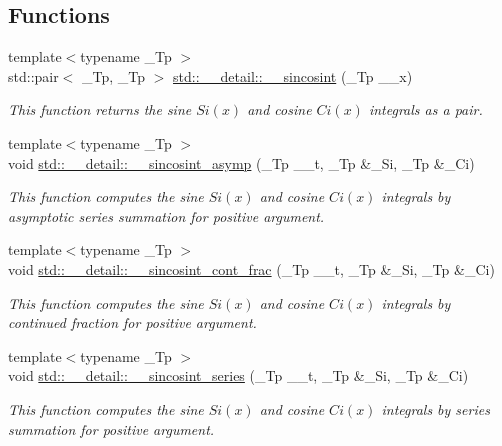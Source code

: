 \subsection*{Functions}
\begin{DoxyCompactItemize}
\item 
{\footnotesize template$<$typename \+\_\+\+Tp $>$ }\\std\+::pair$<$ \+\_\+\+Tp, \+\_\+\+Tp $>$ \hyperlink{namespacestd_1_1____detail_a53bf807a99eef68cdb6f917c7ca085bf}{std\+::\+\_\+\+\_\+detail\+::\+\_\+\+\_\+sincosint} (\+\_\+\+Tp \+\_\+\+\_\+x)
\begin{DoxyCompactList}\small\item\em This function returns the sine $ Si(x) $ and cosine $ Ci(x) $ integrals as a {\ttfamily pair}. \end{DoxyCompactList}\item 
{\footnotesize template$<$typename \+\_\+\+Tp $>$ }\\void \hyperlink{namespacestd_1_1____detail_a976c3ff52c54001de3d409900c9bcb9c}{std\+::\+\_\+\+\_\+detail\+::\+\_\+\+\_\+sincosint\+\_\+asymp} (\+\_\+\+Tp \+\_\+\+\_\+t, \+\_\+\+Tp \&\+\_\+\+Si, \+\_\+\+Tp \&\+\_\+\+Ci)
\begin{DoxyCompactList}\small\item\em This function computes the sine $ Si(x) $ and cosine $ Ci(x) $ integrals by asymptotic series summation for positive argument. \end{DoxyCompactList}\item 
{\footnotesize template$<$typename \+\_\+\+Tp $>$ }\\void \hyperlink{namespacestd_1_1____detail_a211f552bca2944f64e3a1f5593690fda}{std\+::\+\_\+\+\_\+detail\+::\+\_\+\+\_\+sincosint\+\_\+cont\+\_\+frac} (\+\_\+\+Tp \+\_\+\+\_\+t, \+\_\+\+Tp \&\+\_\+\+Si, \+\_\+\+Tp \&\+\_\+\+Ci)
\begin{DoxyCompactList}\small\item\em This function computes the sine $ Si(x) $ and cosine $ Ci(x) $ integrals by continued fraction for positive argument. \end{DoxyCompactList}\item 
{\footnotesize template$<$typename \+\_\+\+Tp $>$ }\\void \hyperlink{namespacestd_1_1____detail_aea85e0044476065ed4a067f1aa9647cb}{std\+::\+\_\+\+\_\+detail\+::\+\_\+\+\_\+sincosint\+\_\+series} (\+\_\+\+Tp \+\_\+\+\_\+t, \+\_\+\+Tp \&\+\_\+\+Si, \+\_\+\+Tp \&\+\_\+\+Ci)
\begin{DoxyCompactList}\small\item\em This function computes the sine $ Si(x) $ and cosine $ Ci(x) $ integrals by series summation for positive argument. \end{DoxyCompactList}\end{DoxyCompactItemize}


